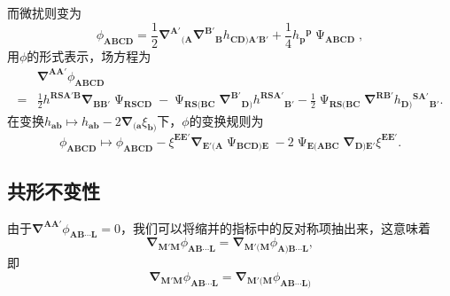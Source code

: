 而微扰则变为
\begin{equation}
	\phi _{\boldsymbol{ABCD}} =\frac{1}{2}\mathbf{\nabla }^{\boldsymbol{A} '}{}_{(\boldsymbol{A}}\mathbf{\nabla }^{\boldsymbol{B} '}{}_{\boldsymbol{B}} h_{\boldsymbol{CD})\boldsymbol{A} '\boldsymbol{B} '} +\frac{1}{4} h{_{\boldsymbol{p}}}^{\boldsymbol{p}} \upPsi _{\boldsymbol{ABCD}} ,
	\label{eq:6.45}
\end{equation}
用$\phi $的形式表示，场方程为
\begin{equation*}
	\begin{aligned}
		& \mathbf{\nabla }^{\boldsymbol{AA} '} \phi _{\boldsymbol{ABCD}}\\
		= & \frac{1}{2} h^{\boldsymbol{RSA} '\boldsymbol{B}}\mathbf{\nabla }_{\boldsymbol{BB} '} \upPsi _{\boldsymbol{RSCD}} -\upPsi _{\boldsymbol{RS}(\boldsymbol{BC}}\mathbf{\nabla }^{\boldsymbol{B} '}{}_{\boldsymbol{D})} h^{\boldsymbol{RSA} '}{}_{\boldsymbol{B} '} -\frac{1}{2} \upPsi _{\boldsymbol{RS}(\boldsymbol{BC}}\mathbf{\nabla }^{\boldsymbol{RB} '} h{_{\boldsymbol{D})}}^{\boldsymbol{SA} '}{}_{\boldsymbol{B} '} .
	\end{aligned}
\end{equation*}
在变换$h_{\boldsymbol{ab}} \mapsto h_{\boldsymbol{ab}} -2\mathbf{\nabla }_{(\boldsymbol{a}} \xi _{\boldsymbol{b})}$下，$\phi $的变换规则为
\begin{equation*}
	\phi _{\boldsymbol{ABCD}} \mapsto \phi _{\boldsymbol{ABCD}} -\xi ^{\boldsymbol{EE} '}\mathbf{\nabla }_{\boldsymbol{E} '(\boldsymbol{A}} \upPsi _{\boldsymbol{BCD})\boldsymbol{E}} -2\upPsi _{\boldsymbol{E}(\boldsymbol{ABC}}\mathbf{\nabla }_{\boldsymbol{D})\boldsymbol{E} '} \xi ^{\boldsymbol{EE} '} .
\end{equation*}

\subsection{共形不变性}

由于$\mathbf{\nabla }^{\boldsymbol{AA} '} \phi _{\boldsymbol{AB} \cdots \boldsymbol{L}} =0$，我们可以将缩并的指标中的反对称项抽出来，这意味着
\begin{equation*}
	\mathbf{\nabla }_{\boldsymbol{M} '\boldsymbol{M}} \phi _{\boldsymbol{AB} \cdots \boldsymbol{L}} =\mathbf{\nabla }_{\boldsymbol{M} '(\boldsymbol{M}} \phi _{\boldsymbol{A})\boldsymbol{B} \cdots \boldsymbol{L}} ,
\end{equation*}
即
\begin{equation}
	\mathbf{\nabla }_{\boldsymbol{M} '\boldsymbol{M}} \phi _{\boldsymbol{AB} \cdots \boldsymbol{L}} =\mathbf{\nabla }_{\boldsymbol{M} '(\boldsymbol{M}} \phi _{\boldsymbol{AB} \cdots \boldsymbol{L})}
	\label{eq:6.46}
\end{equation}


